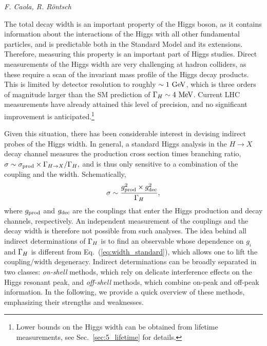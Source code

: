 \begin{center}{\it F. Caola, 
R. R\"ontsch} \end{center}

The total decay width is an important property of the Higgs boson,
as it contains information about the interactions of the Higgs with all other
fundamental particles, and is predictable both in the Standard Model and its extensions.
Therefore, measuring this property is an important part of Higgs studies. 
%
Direct measurements of the Higgs width are very challenging at hadron colliders,
as these require a scan of the invariant mass profile of the Higgs decay
products.
This is limited by detector resolution to roughly $\sim 1~{\rm GeV}$,
which is  three orders of magnitude larger than the SM prediction of  ${\Gamma_H}\sim 4~{\rm MeV}$.
Current LHC measurements have already attained this level of precision, and no significant improvement
is anticipated.\footnote{Lower bounds
on the Higgs width can be obtained
from lifetime measurements, see
Sec.~\ref{sec:5_lifetime} for details.}

Given this situation, there has been considerable interest in devising indirect probes of the
Higgs width. In general, a standard Higgs analysis in the $H\to X$ decay channel 
measures the production cross section times branching ratio,
$\sigma \sim \sigma_{\rm prod}\times {\Gamma_{H\to X}}/{\Gamma_H},$
and is thus  only sensitive to a combination of the coupling and the width. Schematically,
\begin{equation}
\sigma \sim \frac{g_{\rm prod}^2 \times g_{\rm dec}^2}{{\Gamma_H}},
\label{eq:width_standard}
\end{equation}
where $g_{\rm prod}$ and $g_{\rm dec}$ are the couplings that enter the Higgs production
and decay channels, respectively. An independent measurement of the couplings and the decay width is 
therefore not possible from such analyses. The idea
behind all indirect determinations of ${\Gamma_H}$ is to find an observable whose dependence on
$g_i$ and ${\Gamma_H}$ is different from Eq.~(\ref{eq:width_standard}), which allows one
to lift the coupling/width degeneracy. Indirect determinations can be broadly separated in two
classes: \emph{on-shell} methods, which rely on delicate interference effects on the Higgs resonant
peak, and \emph{off-shell} methods, which combine on-peak and off-peak information. In the
following, we provide a quick overview of these methods, emphasizing their strengths and weaknesses. 

